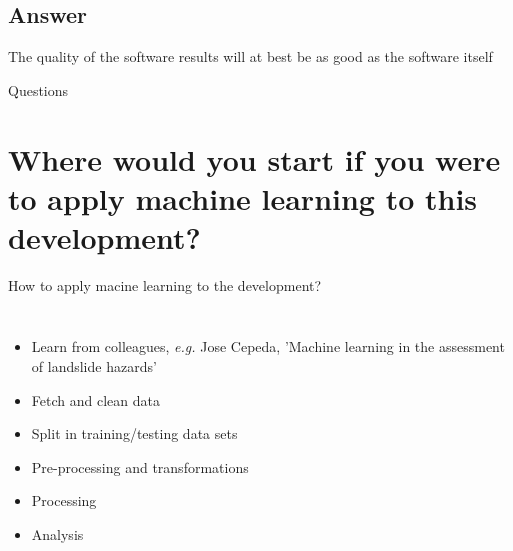 \documentclass[usenames,dvipsnames]{beamer}
\theoremstyle{plain}
\theoremstyle{definition}
\begin{document}
\subsection{Answer}

\begin{frame}{\setframetitle{}}
  {
\centering
\Large  The quality of the software results will at best be as good as the software itself
}
\end{frame}


\appendix

\begin{frame}[label=questions]{Questions}
  \tableofcontents[hideallsubsections]
\end{frame}

\section{Where would you start if you were to apply machine learning to this development?}
\begin{appendixframe}{How to apply macine learning to the development?}
  \begin{columns}[t]
    
    \begin{itemize}
      \item Learn from colleagues, \textit{e.g.} Jose Cepeda, 'Machine learning in the assessment of landslide hazards' 
      \item Fetch and clean data 
      \item Split in training/testing data sets 
      \item Pre-processing and transformations      
      \item Processing 
      \item Analysis 
    \end{itemize}
    
  \end{columns}
\end{appendixframe}
\end{document}
